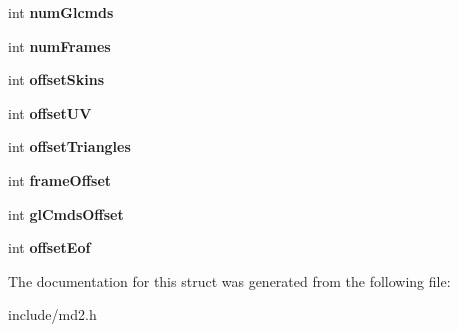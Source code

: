 \begin{DoxyCompactItemize}
\item 
\hypertarget{structMd2_1_1Header_a94e37ca101af00cf7b8b123581e502c0}{int {\bfseries num\-Glcmds}}\label{structMd2_1_1Header_a94e37ca101af00cf7b8b123581e502c0}

\item 
\hypertarget{structMd2_1_1Header_a1c1821a64930c00daae05d71fb7bf44c}{int {\bfseries num\-Frames}}\label{structMd2_1_1Header_a1c1821a64930c00daae05d71fb7bf44c}

\item 
\hypertarget{structMd2_1_1Header_a4b71226cc69e9240a03a25f3563abd9d}{int {\bfseries offset\-Skins}}\label{structMd2_1_1Header_a4b71226cc69e9240a03a25f3563abd9d}

\item 
\hypertarget{structMd2_1_1Header_a1c9b6c3a2a87286282c8d61dc456e2d8}{int {\bfseries offset\-U\-V}}\label{structMd2_1_1Header_a1c9b6c3a2a87286282c8d61dc456e2d8}

\item 
\hypertarget{structMd2_1_1Header_a3443251229e05b22cdb9bda7dd1e6b78}{int {\bfseries offset\-Triangles}}\label{structMd2_1_1Header_a3443251229e05b22cdb9bda7dd1e6b78}

\item 
\hypertarget{structMd2_1_1Header_a6353152103812e58a324c9d20af5183b}{int {\bfseries frame\-Offset}}\label{structMd2_1_1Header_a6353152103812e58a324c9d20af5183b}

\item 
\hypertarget{structMd2_1_1Header_adbefeb116b6beb176f45f2c7456289ca}{int {\bfseries gl\-Cmds\-Offset}}\label{structMd2_1_1Header_adbefeb116b6beb176f45f2c7456289ca}

\item 
\hypertarget{structMd2_1_1Header_aee54d9112285a580bc9fa0a2d38c9643}{int {\bfseries offset\-Eof}}\label{structMd2_1_1Header_aee54d9112285a580bc9fa0a2d38c9643}

\end{DoxyCompactItemize}


The documentation for this struct was generated from the following file\-:\begin{DoxyCompactItemize}
\item 
include/md2.\-h\end{DoxyCompactItemize}

